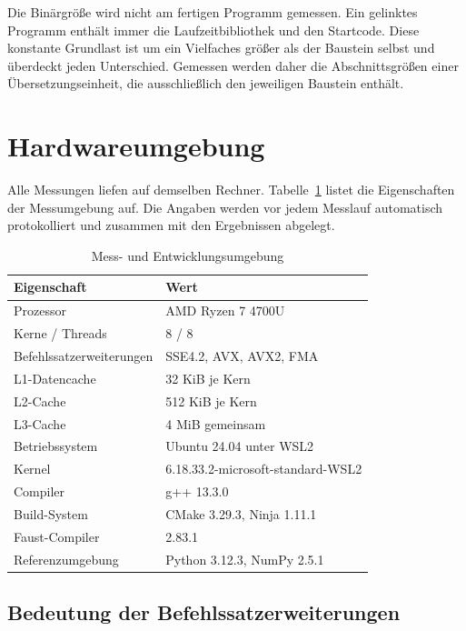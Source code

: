 Die Binärgröße wird nicht am fertigen Programm gemessen. Ein gelinktes
Programm enthält immer die Laufzeitbibliothek und den Startcode. Diese
konstante Grundlast ist um ein Vielfaches größer als der Baustein selbst und
überdeckt jeden Unterschied. Gemessen werden daher die Abschnittsgrößen einer
Übersetzungseinheit, die ausschließlich den jeweiligen Baustein enthält.


\section{Hardwareumgebung}
\label{sec:hardware}

Alle Messungen liefen auf demselben Rechner.
Tabelle~\ref{tab:umgebung} listet die Eigenschaften der Messumgebung auf. Die
Angaben werden vor jedem Messlauf automatisch protokolliert und zusammen mit
den Ergebnissen abgelegt.

\begin{table}[htb]
\centering
\caption{Mess- und Entwicklungsumgebung}
\label{tab:umgebung}
\begin{tabular}{ll}
\hline
Eigenschaft & Wert \\
\hline
Prozessor & AMD Ryzen 7 4700U \\
Kerne / Threads & 8 / 8 \\
Befehlssatzerweiterungen & SSE4.2, AVX, AVX2, FMA \\
L1-Datencache & 32 KiB je Kern \\
L2-Cache & 512 KiB je Kern \\
L3-Cache & 4 MiB gemeinsam \\
Betriebssystem & Ubuntu 24.04 unter WSL2 \\
Kernel & 6.18.33.2-microsoft-standard-WSL2 \\
Compiler & g++ 13.3.0 \\
Build-System & CMake 3.29.3, Ninja 1.11.1 \\
Faust-Compiler & 2.83.1 \\
Referenzumgebung & Python 3.12.3, NumPy 2.5.1 \\
\hline
\end{tabular}
\end{table}

\subsection{Bedeutung der Befehlssatzerweiterungen}

